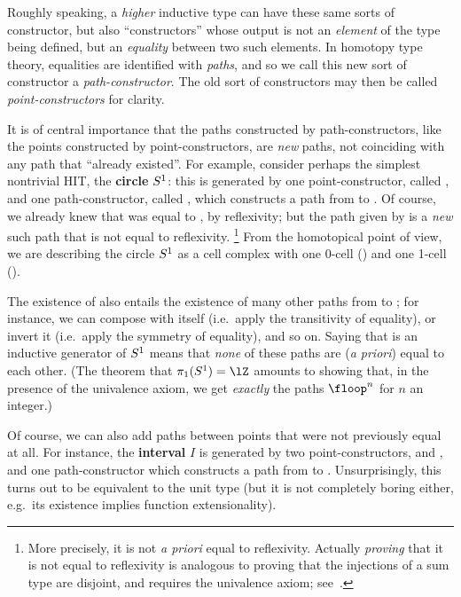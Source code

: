 \documentclass{amsart}
\begin{document}
Roughly speaking, a \emph{higher} inductive type can have these same sorts of constructor, but also ``constructors'' whose output is not an \emph{element} of the type being defined, but an \emph{equality} between two such elements.
In homotopy type theory, equalities are identified with \emph{paths}, and so we call this new sort of constructor a \emph{path-constructor}.
The old sort of constructors may then be called \emph{point-constructors} for clarity.

It is of central importance that the paths constructed by path-constructors, like the points constructed by point-constructors, are \emph{new} paths, not coinciding with any path that ``already existed''.
For example, consider perhaps the simplest nontrivial HIT, the \textbf{circle} $S^1$: this is generated by one point-constructor, called \fbase, and one path-constructor, called \floop, which constructs a path from \fbase to \fbase.
Of course, we already knew that \fbase was equal to \fbase, by reflexivity; but the path given by \floop is a \emph{new} such path that is not equal to reflexivity.%
\footnote{More precisely, it is not \textit{a priori} equal to reflexivity.
  Actually \emph{proving} that it is not equal to reflexivity is analogous to proving that the injections of a sum type are disjoint, and requires the univalence axiom; see~\cite{hottbook,ls:pi1s1}.}
From the homotopical point of view, we are describing the circle $S^1$ as a cell complex with one 0-cell (\fbase) and one 1-cell (\floop).

The existence of \floop also entails the existence of many other paths from \fbase to \fbase; for instance, we can compose \floop with itself (i.e.\ apply the transitivity of equality), or invert it (i.e.\ apply the symmetry of equality), and so on.
Saying that \floop is an inductive generator of $S^1$ means that \emph{none} of these paths are (\textit{a priori}) equal to each other.
(The theorem that $\pi_1(\circtype)=\lZ$ amounts to showing that, in the presence of the univalence axiom, we get \emph{exactly} the paths $\floop^n$ for $n$ an integer.)

Of course, we can also add paths between points that were not previously equal at all.
For instance, the \textbf{interval} $I$ is generated by two point-constructors, \fzero and \fone, and one path-constructor \fseg which constructs a path from \fzero to \fone.
Unsurprisingly, this turns out to be equivalent to the unit type (but it is not completely boring either, e.g.\ its existence implies function extensionality).
\end{document}
